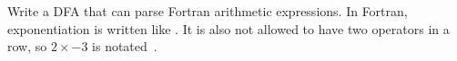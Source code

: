 Write a DFA that can parse Fortran arithmetic expressions. In Fortran,
exponentiation is written like . It is also not allowed to
have two operators in a row, so $2\times-3$ is notated~.
